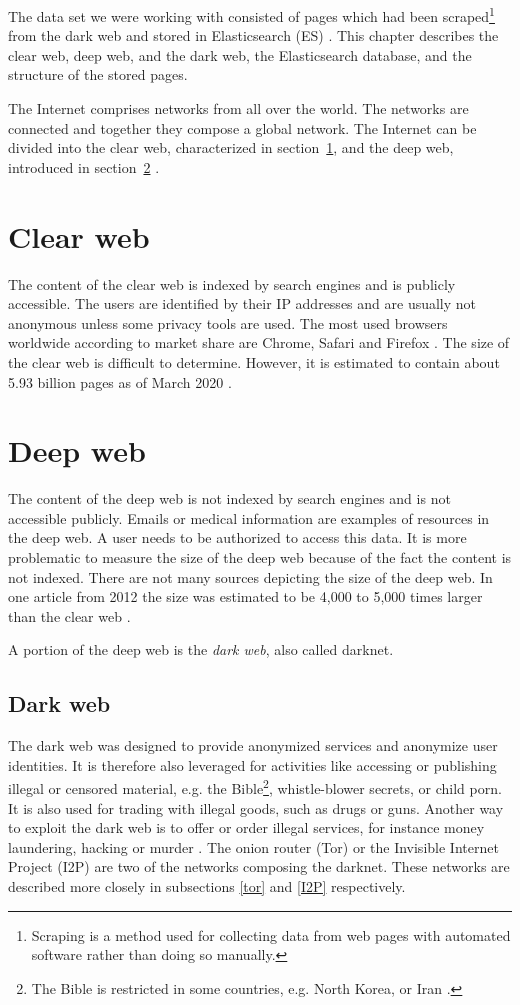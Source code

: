 \label{datasetAnalysis}
The data set we were working with consisted of pages which had been scraped\footnote{Scraping is a method used for collecting data from web pages with automated software rather than doing so manually.} from the dark web and stored in Elasticsearch (ES) \cite{elasticSearch}. This chapter describes the clear web, deep web, and the dark web, the Elasticsearch database, and the structure of the stored pages.

The Internet comprises networks from all over the world. The networks are connected and together they compose a global network. The Internet can be divided into the clear web, characterized in section~\ref{clearWeb}, and the deep web, introduced in section~\ref{deepWeb} \cite{internetStructure}.

\section{Clear web} \label{clearWeb}
The content of the clear web is indexed by search engines and is publicly accessible. The users are identified by their IP addresses and are usually not anonymous unless some privacy tools are used. The most used browsers worldwide according to market share are Chrome, Safari and Firefox \cite{browserMarketShare}. The size of the clear web is difficult to determine. However, it is estimated to contain about 5.93 billion pages as of March 2020 \cite{clearWebSize}.

\section{Deep web} \label{deepWeb}
The content of the deep web is not indexed by search engines and is not accessible publicly. Emails or medical information are examples of resources in the deep web. A user needs to be authorized to access this data. It is more problematic to measure the size of the deep web because of the fact the content is not indexed. There are not many sources depicting the size of the deep web. In one article from 2012 the size was estimated to be 4,000 to 5,000 times larger than the clear web \cite{deepWebSize}. 

A portion of the deep web is the \textit{dark web}, also called darknet. 

\subsection{Dark web} \label{darkWeb}
The dark web was designed to provide anonymized services and anonymize user identities. It is therefore also leveraged for activities like accessing or publishing illegal or censored material, e.g. the Bible\footnote{The Bible is restricted in some countries, e.g. North Korea, or Iran \cite{illegalBible}.}, whistle-blower secrets, or child porn. It is also used for trading with illegal goods, such as drugs or guns. Another way to exploit the dark web is to offer or order illegal services, for instance money laundering, hacking or murder \cite{theDarkNet}. The onion router (Tor) or the Invisible Internet Project (I2P) are two of the networks composing the darknet. These networks are described more closely in subsections \ref{tor} and \ref{I2P} respectively.

